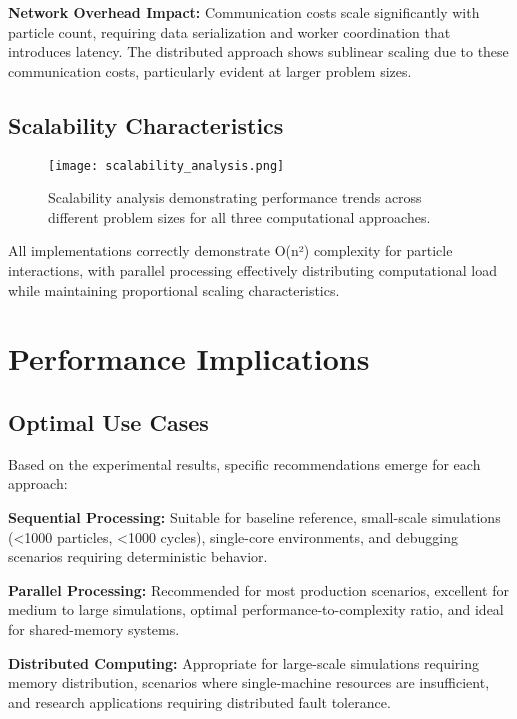 \documentclass[sigconf]{acmart}
\begin{document}
\textbf{Network Overhead Impact:}
Communication costs scale significantly with particle count, requiring data serialization and worker coordination that introduces latency. The distributed approach shows sublinear scaling due to these communication costs, particularly evident at larger problem sizes.

\subsection{Scalability Characteristics}

\begin{figure}[h]
\centering
\texttt{[image: scalability\_analysis.png]}
\caption{Scalability analysis demonstrating performance trends across different problem sizes for all three computational approaches.}
\label{fig:scalability}
\end{figure}

All implementations correctly demonstrate O(n²) complexity for particle interactions, with parallel processing effectively distributing computational load while maintaining proportional scaling characteristics.

\section{Performance Implications}

\subsection{Optimal Use Cases}

Based on the experimental results, specific recommendations emerge for each approach:

\textbf{Sequential Processing:} Suitable for baseline reference, small-scale simulations (<1000 particles, <1000 cycles), single-core environments, and debugging scenarios requiring deterministic behavior.

\textbf{Parallel Processing:} Recommended for most production scenarios, excellent for medium to large simulations, optimal performance-to-complexity ratio, and ideal for shared-memory systems.

\textbf{Distributed Computing:} Appropriate for large-scale simulations requiring memory distribution, scenarios where single-machine resources are insufficient, and research applications requiring distributed fault tolerance.
\end{document}
